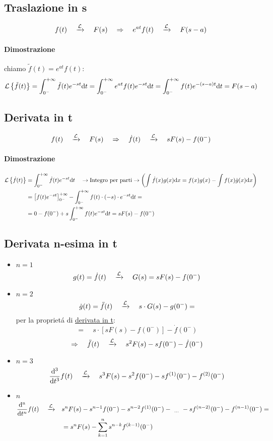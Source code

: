 \documentclass[../main.tex]{subfiles}
\begin{document}
	\subsection{Traslazione in s}
		\label{sec:trasl_s}
		\[
			f(t) \quad \xrightarrow{\mathcal{L}} \quad F(s) \quad \Rightarrow \quad e^{at}f(t) \quad \xrightarrow{\mathcal{L}} \quad F(s-a)
		\]
		\paragraph{Dimostrazione}
		chiamo $ \tilde{f}(t) = e^{at} f(t) $:\\
		\[
			\mathcal{L} \left\lbrace \tilde{f}(t) \right\rbrace = \int_{0^{-}}^{+\infty} \tilde{f}(t) e^{- s t} \mathrm{d} t = \int_{0^{-}}^{+\infty} e^{at}f(t) e^{- s t} \mathrm{d} t = \int_{0^{-}}^{+ \infty} f(t) e^{-(s-a)t} \mathrm{d}t = F(s-a)
		\]
	\subsection{Derivata in t}
		\label{sec:deriv_t}
		\[
			f(t) \quad \xrightarrow{\mathcal{L}} \quad F(s) \quad \Rightarrow \quad \dot{f}(t) \quad \xrightarrow{\mathcal{L}} \quad sF(s)-f(0^{-})
		\]
		\paragraph{Dimostrazione}
		\begin{align*}
			\mathcal{L} \left\lbrace \dot{f}(t) \right\rbrace &= \int_{0^{-}}^{+\infty} \dot{f}(t) e^{- s t} \mathrm{d} t \quad \rightarrow \text{Integro per parti} \rightarrow \left( \int \dot{f}(x)g(x)\mathrm{d}x = f(x)g(x) - \int f(x) \dot g(x) \mathrm{d}x \right)
			\\
			&= \left[ f(t)e^{-st} \right]_{0^{-}}^{+\infty} - \int_{0^{-}}^{+\infty} f(t) \cdot (-s) \cdot e^{- s t} \mathrm{d} t =
			\\
			&= 0 - f(0^{-}) + s \int_{0^{-}}^{+\infty} f(t) e^{- s t} \mathrm{d} t = sF(s)-f(0^{-})
		\end{align*}
	\subsection{Derivata n-esima in t}
		\label{sec:deriv_n_t}
		\begin{itemize}
			\item $ n=1 $
				\[
					g(t)=\dot{f}(t) \quad \xrightarrow{\mathcal{L}} \quad G(s) = sF(s) - f(0^{-})
				\]
			\item $ n=2 $
				\[
					\dot{g}(t) = \ddot{f}(t) \quad \xrightarrow{\mathcal{L}} \quad s \cdot G(s) - g(0^{-}) =
				\]
				per la propriet\'a di \hyperref[sec:deriv_t]{derivata in t}:
				\[
					= \quad s \cdot \left[ sF(s) - f(0^{-}) \right] - \dot{f}(0^{-})
				\]
				\[
					\Rightarrow\quad \ddot{f}(t) \quad \xrightarrow{\mathcal{L}} \quad s^2 F(s) - s f(0^{-}) - \dot{f}(0^{-})
				\]
			\item $ n=3 $
				\[
					\frac{\mathrm{d^3}}{\mathrm{d}t^3}f(t) \quad \xrightarrow{\mathcal{L}} \quad s^3 F(s) - s^2 f(0^{-}) - s f^{(1)}(0^{-}) - f^{(2)}(0^{-})
				\]
			\item $ n $
				\[
					\begin{aligned}
						\frac{\mathrm{d^n}}{\mathrm{d}t^n}f(t) \quad \xrightarrow{\mathcal{L}} \quad &s^n F(s) - s^{n-1} f(0^{-}) - s^{n-2} f^{(1)}(0^{-}) -\ _{\dots}\ - s f^{(n-2)}(0^{-}) - f^{(n-1)}(0^{-}) =
						\\
						&= s^n F(s) - \sum_{k = 1}^{n} s^{n-k} f^{(k - 1)}(0^{-})
					\end{aligned}
				\]
		\end{itemize}
	
\end{document}
